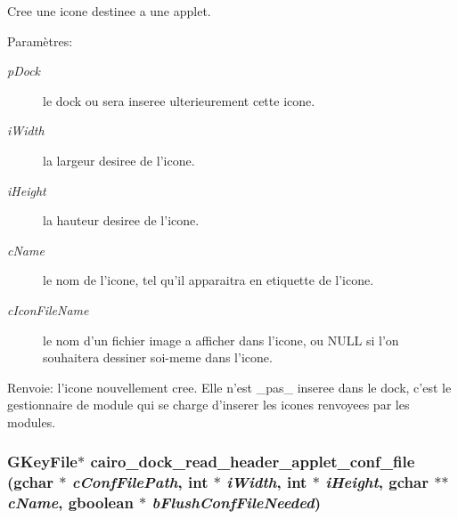 Cree une icone destinee a une applet. \begin{Desc}
\item[Param\`{e}tres:]
\begin{description}
\item[{\em p\-Dock}]le dock ou sera inseree ulterieurement cette icone. \item[{\em i\-Width}]la largeur desiree de l'icone. \item[{\em i\-Height}]la hauteur desiree de l'icone. \item[{\em c\-Name}]le nom de l'icone, tel qu'il apparaitra en etiquette de l'icone. \item[{\em c\-Icon\-File\-Name}]le nom d'un fichier image a afficher dans l'icone, ou NULL si l'on souhaitera dessiner soi-meme dans l'icone. \end{description}
\end{Desc}
\begin{Desc}
\item[Renvoie:]l'icone nouvellement cree. Elle n'est \_\-pas\_\- inseree dans le dock, c'est le gestionnaire de module qui se charge d'inserer les icones renvoyees par les modules. \end{Desc}
\subsubsection{\setlength{\rightskip}{0pt plus 5cm}GKey\-File$\ast$ cairo\_\-dock\_\-read\_\-header\_\-applet\_\-conf\_\-file (gchar $\ast$ {\em c\-Conf\-File\-Path}, int $\ast$ {\em i\-Width}, int $\ast$ {\em i\-Height}, gchar $\ast$$\ast$ {\em c\-Name}, gboolean $\ast$ {\em b\-Flush\-Conf\-File\-Needed})}\label{cairo-dock-applet-factory_8c_4f12f5176c1a66173bbe3d52954fac98}


